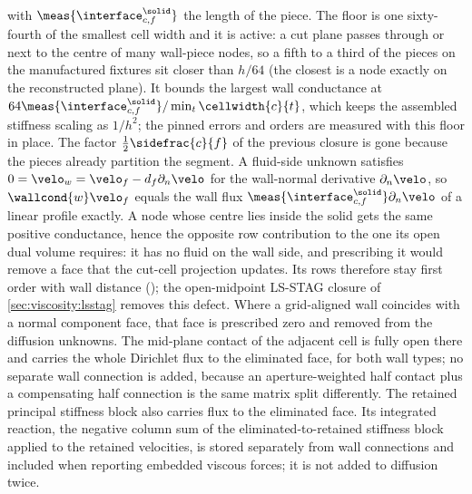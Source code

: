 with $\meas{\interface^{\solid}_{c,f}}$ the length of the piece. The floor is
one sixty-fourth of the smallest cell width and it is active: a cut plane
passes through or next to the centre of many wall-piece nodes, so a fifth to a
third of the pieces on the manufactured fixtures sit closer than $h/64$ (the
closest is a node exactly on the reconstructed plane). It bounds the largest
wall conductance at $64\meas{\interface^{\solid}_{c,f}}/\min_t\cellwidth{c}{t}$,
which keeps the assembled stiffness scaling as $1/h^2$; the pinned errors and
orders are measured with this floor in place. The factor
$\tfrac12\sidefrac{c}{f}$ of the previous closure is gone because the pieces
already partition the segment. A fluid-side unknown satisfies
$0=\velo_w=\velo_f-d_f\partial_n\velo$ for the wall-normal derivative
$\partial_n\velo$, so $\wallcond{w}\velo_f$ equals the wall flux
$\meas{\interface^{\solid}_{c,f}}\partial_n\velo$ of a linear profile
exactly. A node whose centre lies inside the solid gets the same positive
conductance, hence the opposite row contribution to the one its open dual
volume requires: it has no fluid on the wall side, and prescribing it would
remove a face that the cut-cell projection updates. Its rows therefore stay
first order with wall distance (); the open-midpoint LS-STAG
closure of \cref{sec:viscosity:lsstag} removes this defect.
Where a grid-aligned wall coincides with a normal component face, that face is
prescribed zero and removed from the diffusion unknowns. The mid-plane contact
of the adjacent cell is fully open there and carries the whole Dirichlet flux
to the eliminated face, for both wall types; no separate wall connection is
added, because an aperture-weighted half contact plus a compensating half
connection is the same matrix split differently. The retained principal
stiffness block also
carries flux to the eliminated face. Its integrated reaction, the negative
column sum of the eliminated-to-retained stiffness block applied to the
retained velocities, is stored separately from wall connections and included
when reporting embedded viscous forces; it is not added to diffusion twice.

